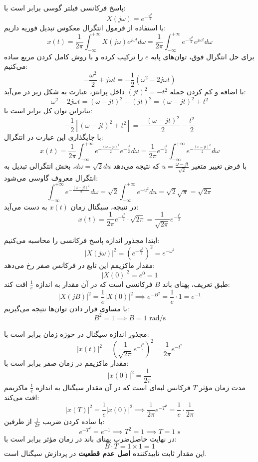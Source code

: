 پاسخ فرکانسی فیلتر گوسی برابر است با:
\[ X(j\omega) = e^{-\frac{\omega^2}{2}} \]
با استفاده از فرمول انتگرال معکوس تبدیل فوریه داریم:
\[ x(t) = \frac{1}{2\pi} \int_{-\infty}^{+\infty} X(j\omega) e^{j\omega t} d\omega = \frac{1}{2\pi} \int_{-\infty}^{+\infty} e^{-\frac{\omega^2}{2}} e^{j\omega t} d\omega \]
برای حل انتگرال فوق، توان‌های پایه $e$ را ترکیب کرده و با روش کامل کردن مربع ساده می‌کنیم:
\[ -\frac{\omega^2}{2} + j\omega t = -\frac{1}{2}\left( \omega^2 - 2j\omega t \right) \]
با اضافه و کم کردن جمله $(jt)^2 = -t^2$ داخل پرانتز، عبارت به شکل زیر در می‌آید:
\[ \omega^2 - 2j\omega t = (\omega - jt)^2 - (jt)^2 = (\omega - jt)^2 + t^2 \]
بنابراین توان کل برابر است با:
\[ -\frac{1}{2}\left[ (\omega - jt)^2 + t^2 \right] = -\frac{(\omega - jt)^2}{2} - \frac{t^2}{2} \]
با جایگذاری این عبارت در انتگرال:
\[ x(t) = \frac{1}{2\pi} \int_{-\infty}^{+\infty} e^{-\frac{(\omega - jt)^2}{2}} e^{-\frac{t^2}{2}} d\omega = \frac{1}{2\pi} e^{-\frac{t^2}{2}} \int_{-\infty}^{+\infty} e^{-\frac{(\omega - jt)^2}{2}} d\omega \]
با فرض تغییر متغیر $u = \frac{\omega - jt}{\sqrt{2}}$ که نتیجه می‌دهد $d\omega = \sqrt{2}du$، بخش انتگرالی تبدیل به انتگرال معروف گاوسی می‌شود:
\[ \int_{-\infty}^{+\infty} e^{-\frac{(\omega - jt)^2}{2}} d\omega = \sqrt{2} \int_{-\infty}^{+\infty} e^{-u^2} du = \sqrt{2}\sqrt{\pi} = \sqrt{2\pi} \]
در نتیجه، سیگنال زمان $x(t)$ به دست می‌آید:
\[ x(t) = \frac{1}{2\pi} e^{-\frac{t^2}{2}} \cdot \sqrt{2\pi} = \frac{1}{\sqrt{2\pi}} e^{-\frac{t^2}{2}} \]

ابتدا مجذور اندازه پاسخ فرکانسی را محاسبه می‌کنیم:
\[ |X(j\omega)|^2 = \left( e^{-\frac{\omega^2}{2}} \right)^2 = e^{-\omega^2} \]
مقدار ماکزیمم این تابع در فرکانس صفر رخ می‌دهد:
\[ |X(0)|^2 = e^0 = 1 \]
طبق تعریف، پهنای باند $B$ فرکانسی است که در آن مقدار به اندازه $\frac{1}{e}$ افت کند:
\[ |X(jB)|^2 = \frac{1}{e} |X(0)|^2 \implies e^{-B^2} = \frac{1}{e} \cdot 1 = e^{-1} \]
با مساوی قرار دادن توان‌ها نتیجه می‌گیریم:
\[ B^2 = 1 \implies B = 1 \text{ rad/s} \]

مجذور اندازه سیگنال در حوزه زمان برابر است با:
\[ |x(t)|^2 = \left( \frac{1}{\sqrt{2\pi}} e^{-\frac{t^2}{2}} \right)^2 = \frac{1}{2\pi} e^{-t^2} \]
مقدار ماکزیمم در زمان صفر برابر است با:
\[ |x(0)|^2 = \frac{1}{2\pi} \]
مدت زمان مؤثر $T$ فرکانس لبه‌ای است که در آن مقدار سیگنال به اندازه $\frac{1}{e}$ ماکزیمم افت می‌کند:
\[ |x(T)|^2 = \frac{1}{e} |x(0)|^2 \implies \frac{1}{2\pi} e^{-T^2} = \frac{1}{e} \cdot \frac{1}{2\pi} \]
با ساده کردن ضریب $\frac{1}{2\pi}$ از طرفین:
\[ e^{-T^2} = e^{-1} \implies T^2 = 1 \implies T = 1 \text{ s} \]
در نهایت حاصل‌ضرب پهنای باند در زمان مؤثر برابر است با:
\[ B \cdot T = 1 \times 1 = 1 \]
این مقدار ثابت تاییدکننده \textbf{اصل عدم قطعیت} در پردازش سیگنال است.
